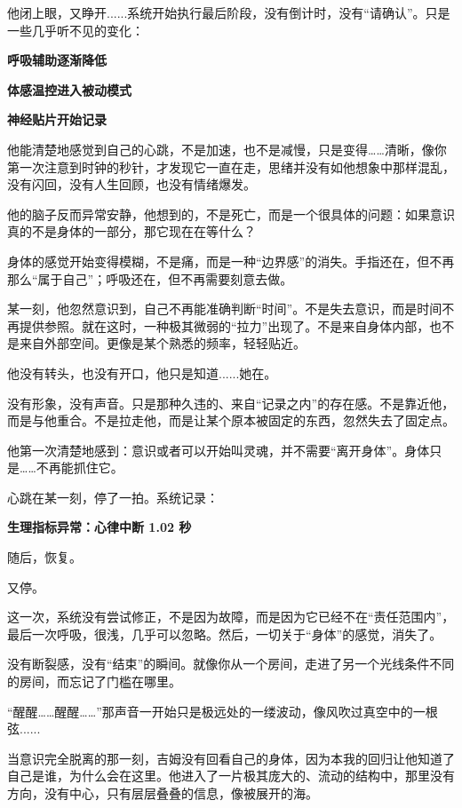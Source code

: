 他闭上眼，又睁开......系统开始执行最后阶段，没有倒计时，没有“请确认”。只是一些几乎听不见的变化：

\begin{center}
\textbf{呼吸辅助逐渐降低}
\end{center}

\begin{center}
\textbf{体感温控进入被动模式}
\end{center}

\begin{center}
\textbf{神经贴片开始记录}
\end{center}

他能清楚地感觉到自己的心跳，不是加速，也不是减慢，只是变得……清晰，像你第一次注意到时钟的秒针，才发现它一直在走，思绪并没有如他想象中那样混乱，没有闪回，没有人生回顾，也没有情绪爆发。

他的脑子反而异常安静，他想到的，不是死亡，而是一个很具体的问题：如果意识真的不是身体的一部分，那它现在在等什么？

身体的感觉开始变得模糊，不是痛，而是一种“边界感”的消失。手指还在，但不再那么“属于自己”；呼吸还在，但不再需要刻意去做。

某一刻，他忽然意识到，自己不再能准确判断“时间”。不是失去意识，而是时间不再提供参照。就在这时，一种极其微弱的“拉力”出现了。不是来自身体内部，也不是来自外部空间。更像是某个熟悉的频率，轻轻贴近。

他没有转头，也没有开口，他只是知道......她在。

没有形象，没有声音。只是那种久违的、来自“记录之内”的存在感。不是靠近他，而是与他重合。不是拉走他，而是让某个原本被固定的东西，忽然失去了固定点。

他第一次清楚地感到：意识或者可以开始叫灵魂，并不需要“离开身体”。身体只是……不再能抓住它。

心跳在某一刻，停了一拍。系统记录：

\begin{center}
\textbf{生理指标异常：心律中断 1.02 秒}
\end{center}

随后，恢复。

又停。

这一次，系统没有尝试修正，不是因为故障，而是因为它已经不在“责任范围内”，最后一次呼吸，很浅，几乎可以忽略。然后，一切关于“身体”的感觉，消失了。

没有断裂感，没有“结束”的瞬间。就像你从一个房间，走进了另一个光线条件不同的房间，而忘记了门槛在哪里。

“醒醒……醒醒……”那声音一开始只是极远处的一缕波动，像风吹过真空中的一根弦......

当意识完全脱离的那一刻，吉姆没有回看自己的身体，因为本我的回归让他知道了自己是谁，为什么会在这里。他进入了一片极其庞大的、流动的结构中，那里没有方向，没有中心，只有层层叠叠的信息，像被展开的海。
